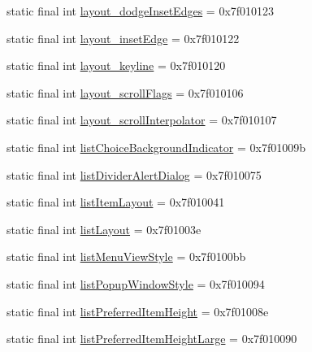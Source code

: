 \begin{CompactItemize}
\item 
static final int \hyperlink{classandroid_1_1support_1_1v7_1_1cardview_1_1_r_1_1attr_9bd5fb363b99c8c116c99908b401d409}{layout\_\-dodgeInsetEdges} = 0x7f010123
\item 
static final int \hyperlink{classandroid_1_1support_1_1v7_1_1cardview_1_1_r_1_1attr_5f28088a362144ee13650b4b7cd89e77}{layout\_\-insetEdge} = 0x7f010122
\item 
static final int \hyperlink{classandroid_1_1support_1_1v7_1_1cardview_1_1_r_1_1attr_f2f93bdcc0c8d3b7ffe6163df6bc4a13}{layout\_\-keyline} = 0x7f010120
\item 
static final int \hyperlink{classandroid_1_1support_1_1v7_1_1cardview_1_1_r_1_1attr_bffb0d3f8add1f1e367a6d3caf2743bc}{layout\_\-scrollFlags} = 0x7f010106
\item 
static final int \hyperlink{classandroid_1_1support_1_1v7_1_1cardview_1_1_r_1_1attr_6bd65db38899f82a9e53033f329243ee}{layout\_\-scrollInterpolator} = 0x7f010107
\item 
static final int \hyperlink{classandroid_1_1support_1_1v7_1_1cardview_1_1_r_1_1attr_7330f5284ce41e9c1004f0d7c52d3ffa}{listChoiceBackgroundIndicator} = 0x7f01009b
\item 
static final int \hyperlink{classandroid_1_1support_1_1v7_1_1cardview_1_1_r_1_1attr_b3adc5eeb2dc9294513539a9d8d486ac}{listDividerAlertDialog} = 0x7f010075
\item 
static final int \hyperlink{classandroid_1_1support_1_1v7_1_1cardview_1_1_r_1_1attr_9778664dc34f4fa3e9c6574fc2bab0b3}{listItemLayout} = 0x7f010041
\item 
static final int \hyperlink{classandroid_1_1support_1_1v7_1_1cardview_1_1_r_1_1attr_aa7578f4d075c8bdfe762a8ce13b1715}{listLayout} = 0x7f01003e
\item 
static final int \hyperlink{classandroid_1_1support_1_1v7_1_1cardview_1_1_r_1_1attr_c5c0edc8f6b4033d7888076cdeaa7e14}{listMenuViewStyle} = 0x7f0100bb
\item 
static final int \hyperlink{classandroid_1_1support_1_1v7_1_1cardview_1_1_r_1_1attr_1a63c2adc4813525b0de545a8c07bd85}{listPopupWindowStyle} = 0x7f010094
\item 
static final int \hyperlink{classandroid_1_1support_1_1v7_1_1cardview_1_1_r_1_1attr_494fd87c00e4d8ef07d1a8fe8f7461d3}{listPreferredItemHeight} = 0x7f01008e
\item 
static final int \hyperlink{classandroid_1_1support_1_1v7_1_1cardview_1_1_r_1_1attr_b41fc8697f4850be1af15080cc3206d8}{listPreferredItemHeightLarge} = 0x7f010090

\end{CompactItemize}
